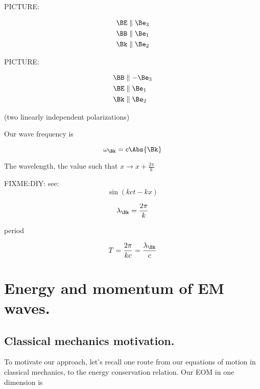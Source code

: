 PICTURE:

\begin{align*}
\BE &\parallel \Be_3 \\
\BB &\parallel \Be_1 \\
\Bk &\parallel \Be_2
\end{align*}

PICTURE:

\begin{align*}
\BB &\parallel -\Be_3 \\
\BE &\parallel \Be_1 \\
\Bk &\parallel \Be_2
\end{align*}

(two linearly independent polarizations)

Our wave frequency is

\begin{equation}\label{eqn:relativisticElectrodynamicsL16:370}
\omega_{\Bk} = c \Abs{\Bk}
\end{equation}

The wavelength, the value such that $x \rightarrow x + \frac{2 \pi}{k}$

FIXME:DIY: see:
\begin{equation}\label{eqn:relativisticElectrodynamicsL16:390}
\sin(k c t - k x)
\end{equation}

\begin{equation}\label{eqn:relativisticElectrodynamicsL16:410}
\lambda_{\Bk} = \frac{2 \pi}{k}
\end{equation}

period

\begin{equation}\label{eqn:relativisticElectrodynamicsL16:430}
T = \frac{ 2 \pi} {k c} = \frac{\lambda_\Bk}{c}
\end{equation}

\section{Energy and momentum of EM waves.}

\subsection{Classical mechanics motivation.}

To motivate our approach, let's recall one route from our equations of motion in classical mechanics, to the energy conservation relation.  Our EOM in one dimension is

